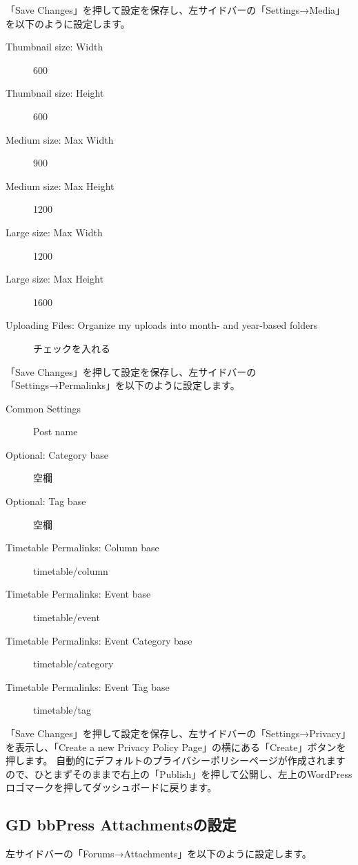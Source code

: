 \documentclass[titlepage,10pt,a4paper,uplatex]{jsbook}
\begin{document}
「Save Changes」を押して設定を保存し、左サイドバーの「Settings→Media」を以下のように設定します。

\begin{description}
\item[Thumbnail size: Width] 600
\item[Thumbnail size: Height] 600
\item[Medium size: Max Width] 900
\item[Medium size: Max Height] 1200
\item[Large size: Max Width] 1200
\item[Large size: Max Height] 1600
\item[Uploading Files: Organize my uploads into month- and year-based folders] チェックを入れる
\end{description}

「Save Changes」を押して設定を保存し、左サイドバーの「Settings→Permalinks」を以下のように設定します。

\begin{description}
\item[Common Settings] Post name
\item[Optional: Category base] 空欄
\item[Optional: Tag base] 空欄
\item[Timetable Permalinks: Column base] timetable/column
\item[Timetable Permalinks: Event base] timetable/event
\item[Timetable Permalinks: Event Category base] timetable/category
\item[Timetable Permalinks: Event Tag base] timetable/tag
\end{description}

「Save Changes」を押して設定を保存し、左サイドバーの「Settings→Privacy」を表示し、「Create a new Privacy Policy Page」の横にある「Create」ボタンを押します。
自動的にデフォルトのプライバシーポリシーページが作成されますので、ひとまずそのままで右上の「Publish」を押して公開し、左上のWordPressロゴマークを押してダッシュボードに戻ります。

\subsection{GD bbPress Attachmentsの設定}

左サイドバーの「Forums→Attachments」を以下のように設定します。
\end{document}
